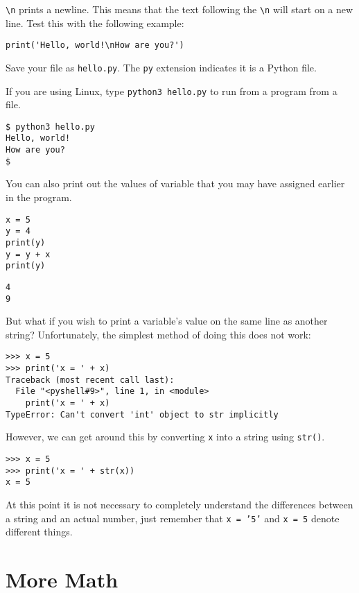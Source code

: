 \documentclass[11pt]{cselabheader}
\begin{document}
\texttt{\textbackslash n} prints a newline. This means that the text following
the \texttt{\textbackslash n} will start on a new line. Test this with the
following example:
\begin{lstlisting}[style=python]
print('Hello, world!\nHow are you?')
\end{lstlisting}

Save your file as \texttt{hello.py}. The \texttt{py} extension indicates it is a
Python file.

If you are using Linux, type \texttt{python3 hello.py} to run from a program
from a file.
\begin{lstlisting}[style=bash]
$ python3 hello.py
Hello, world!
How are you?
$
\end{lstlisting}

You can also print out the values of variable that you may have assigned earlier
in the program.
\begin{lstlisting}[style=python]
x = 5
y = 4
print(y)
y = y + x
print(y)
\end{lstlisting}

\begin{lstlisting}[style=bash]
4
9
\end{lstlisting}

But what if you wish to print a variable's value on the same line as another
string? Unfortunately, the simplest method of doing this does not work:

\begin{lstlisting}[style=bash]
>>> x = 5
>>> print('x = ' + x)
Traceback (most recent call last):
  File "<pyshell#9>", line 1, in <module>
    print('x = ' + x)
TypeError: Can't convert 'int' object to str implicitly
\end{lstlisting}

However, we can get around this by converting \texttt{x} into a string using
\texttt{str()}.

\begin{lstlisting}[style=bash]
>>> x = 5
>>> print('x = ' + str(x))
x = 5
\end{lstlisting}

At this point it is not necessary to completely understand the differences
between a string and an actual number, just remember that \texttt{x = '5'} and
\texttt{x = 5} denote different things.

\pagebreak

\section{More Math}
\end{document}
